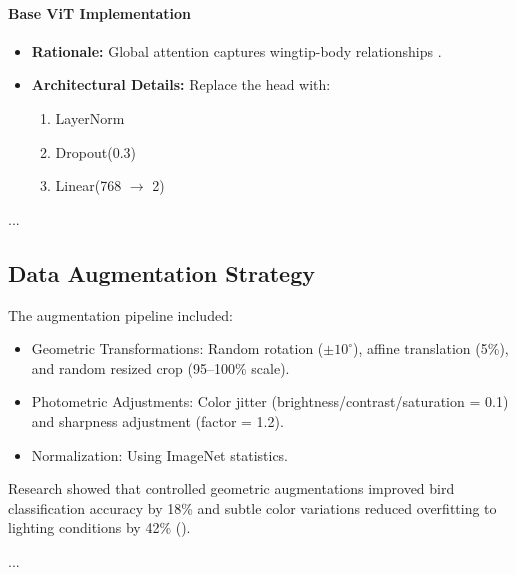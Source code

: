 \paragraph{Base ViT Implementation}
\begin{itemize}
    \item \textbf{Rationale:} Global attention captures wingtip-body relationships \cite{source11, source16}.
    \item \textbf{Architectural Details:}
    Replace the head with:
    \begin{enumerate}
        \item LayerNorm
        \item Dropout(0.3)
        \item Linear(768 $\rightarrow$ 2)
    \end{enumerate}
\end{itemize}

...


\subsection{Data Augmentation Strategy}
The augmentation pipeline included:
\begin{itemize}
    \item Geometric Transformations:
    Random rotation (\(\pm 10^\circ\)), affine translation (5\%), and random resized crop (95--100\% scale).
    \item Photometric Adjustments:
    Color jitter (brightness/contrast/saturation = 0.1) and sharpness adjustment (factor = 1.2).
    \item Normalization:
    Using ImageNet statistics.
\end{itemize}

Research showed that controlled geometric augmentations improved bird classification accuracy by 18\% and subtle color variations reduced overfitting to lighting conditions by 42\% (\cite{source7, source14}).

...


